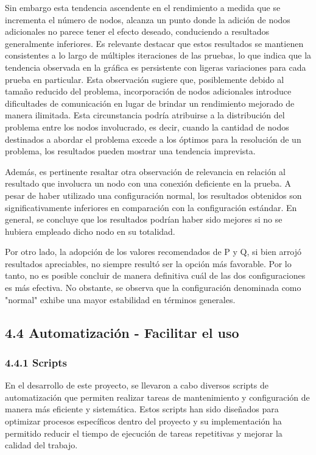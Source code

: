 \begin{spacing}{1.5}
Sin embargo esta tendencia ascendente en el rendimiento a medida que se incrementa el número de nodos, alcanza un punto donde la adición de nodos adicionales no parece tener el efecto deseado, conduciendo a resultados generalmente inferiores. Es relevante destacar que estos resultados se mantienen consistentes a lo largo de múltiples iteraciones de las pruebas, lo que indica que la tendencia observada en la gráfica es persistente con ligeras variaciones para cada prueba en particular. Esta observación sugiere que, posiblemente debido al tamaño reducido del problema, incorporación de nodos adicionales introduce dificultades de comunicación en lugar de brindar un rendimiento mejorado de manera ilimitada. Esta circunstancia podría atribuirse a la distribución del problema entre los nodos involucrado, es decir, cuando la cantidad de nodos destinados a abordar el problema excede a los óptimos para la resolución de un problema, los resultados pueden mostrar una tendencia imprevista.

Además, es pertinente resaltar otra observación de relevancia en relación al resultado que involucra un nodo con una conexión deficiente en la prueba. A pesar de haber utilizado una configuración normal, los resultados obtenidos son significativamente inferiores en comparación con la configuración estándar. En general, se concluye que los resultados podrían haber sido mejores si no se hubiera empleado dicho nodo en su totalidad.

Por otro lado, la adopción de los valores recomendados de P y Q, si bien arrojó resultados apreciables, no siempre resultó ser la opción más favorable. Por lo tanto, no es posible concluir de manera definitiva cuál de las dos configuraciones es más efectiva. No obstante, se observa que la configuración denominada como "normal" exhibe una mayor estabilidad en términos generales.

  \subsection{4.4 Automatización - Facilitar el uso}   \label{chap:4.4}

  \subsubsection{4.4.1 Scripts}

  En el desarrollo de este proyecto, se llevaron a cabo diversos scripts de
  automatización que permiten realizar tareas de mantenimiento y configuración
  de
  manera más eficiente y sistemática. Estos scripts han sido diseñados para
  optimizar procesos específicos dentro del proyecto y su implementación ha
  permitido reducir el tiempo de ejecución de tareas repetitivas y mejorar la
  calidad del trabajo.


\end{spacing}
